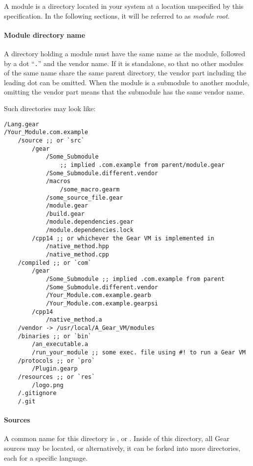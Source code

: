 A module is a directory located in your system at a location unspecified by this specification. In the following sections, it will be referred to as {\em module root}. 

\paragraph{Module directory name}
A directory holding a module must have the same name as the module, followed by a dot ``\lstinline!.!'' and the vendor name. If it is standalone, so that no other modules of the same name share the same parent directory, the vendor part including the leading dot can be omitted. When the module is a submodule to another module, omitting the vendor part means that the submodule has the same vendor name. 

\example Such directories may look like:
\begin{lstlisting}[deletekeywords={module}]
/Lang.gear
/Your_Module.com.example
    /source ;; or `src`
        /gear
            /Some_Submodule 
                ;; implied .com.example from parent/module.gear
            /Some_Submodule.different.vendor
            /macros
                /some_macro.gearm
            /some_source_file.gear
            /module.gear
            /build.gear
            /module.dependencies.gear
            /module.dependencies.lock
        /cpp14 ;; or whichever the Gear VM is implemented in
            /native_method.hpp
            /native_method.cpp
    /compiled ;; or `com`
        /gear
            /Some_Submodule ;; implied .com.example from parent
            /Some_Submodule.different.vendor
            /Your_Module.com.example.gearb
            /Your_Module.com.example.gearpsi
        /cpp14
            /native_method.a
    /vendor -> /usr/local/A_Gear_VM/modules
    /binaries ;; or `bin`
        /an_executable.a
        /run_your_module ;; some exec. file using #! to run a Gear VM
    /protocols ;; or `pro`
        /Plugin.gearp
    /resources ;; or `res`
        /logo.png
    /.gitignore
    /.git
\end{lstlisting} 

\paragraph{Sources}
A common name for this directory is , or . Inside of this directory, all Gear sources may be located, or alternatively, it can be forked into more directories, each for a specific language. 

